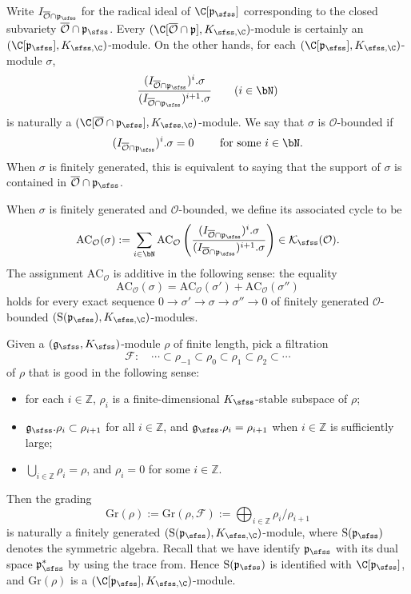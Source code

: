 \documentclass[12pt,a4paper]{amsart}
\newcommand{\CF}{{\mathcal {F}}}
\newcommand{\CK}{{\mathcal {K}}}
\newcommand{\CO}{{\mathcal {O}}}
\newcommand{\oS}{\operatorname{S}}
\newcommand{\g}{\mathfrak g}
\newcommand{\p}{\mathfrak p}
\newcommand{\Z}{\mathbb{Z}}
\newcommand{\be}{\begin {equation}}
\newcommand{\ee}{\end {equation}}
\numberwithin{equation}{section}
\theoremstyle{remark}
\begin{document}
Write $I_{\overline \CO\cap \p_\sfss}$ for the radical ideal of $\C[\p_\sfss]$ corresponding to the closed subvariety $\overline \CO\cap \p_\sfss$. 
Every $(\C[\overline \CO\cap \p], K_{\sfss, \C})$-module is certainly an $(\C[\p_\sfss], K_{\sfss,\C})$-module. 
On the other hands, for each  $(\C[\p_{\sfss}], K_{\sfss, \C})$-module $\sigma$, 
\[
  \frac{(I_{\overline \CO\cap \p_\sfss})^i.\sigma}{(I_{\overline \CO\cap \p_\sfss})^{i+1}.\sigma}\qquad (i\in \bN)
\]
is naturally a $(\C[\overline \CO\cap \p_\sfss], K_{\sfss, \C})$-module.
We say that $\sigma$ is $\CO$-bounded if 
\[
(I_{\overline \CO\cap \p_\sfss})^i .\sigma=0\qquad
\textrm{
for some $i\in \bN$.}
\]
When $\sigma$ is finitely generated, this is equivalent to saying that  the support of $\sigma$ is contained in $\overline{\CO}\cap \p_\sfss$.

 When $\sigma$ is finitely generated and $\CO$-bounded, we define its associated cycle to be
\[
  \mathrm{AC}_\CO(\sigma):=\sum_{i\in \bN}\mathrm{AC}_\CO\left(\frac{(I_{\overline \CO\cap \p_\sfss})^i.\sigma}{(I_{\overline \CO\cap \p_\sfss})^{i+1}.\sigma}\right)\in  \CK_\sfss(\CO).
\]
The assignment $\mathrm{AC}_\CO$ is additive in the following sense: the equality 
\[
 \mathrm{AC}_\CO(\sigma)= \mathrm{AC}_\CO(\sigma')+ \mathrm{AC}_\CO(\sigma'')
\]
holds for every exact sequence 
$0\rightarrow \sigma'\rightarrow \sigma\rightarrow \sigma''\rightarrow 0$ of finitely generated $\CO$-bounded $(\oS(\p_{\sfss}), K_{\sfss, \C})$-modules. 


Given a $(\g_\sfss, K_{\sfss})$-module $\rho$ of finite length, pick a filtration 
\be\label{goodf}
\CF:\quad  \cdots\subset \rho_{-1}\subset \rho_0\subset \rho_1\subset \rho_2\subset \cdots
\ee
of $\rho$ that is good in the following sense:
\begin{itemize}
\item for each $i\in \Z$, $\rho_i$ is a finite-dimensional  $K_{\sfss}$-stable subspace of $\rho$;
\item $\g_\sfss.\rho_i\subset \rho_{i+1}$ for all $i\in \Z$, and $\g_\sfss.\rho_i=\rho_{i+1}$ when  $i\in \Z$ is sufficiently large; 
\item $\bigcup_{i\in \Z} \rho_i=\rho$, and $\rho_i=0$ for some $i\in \Z$.
\end{itemize}
Then the grading 
\[
  \mathrm{Gr}(\rho):= \mathrm{Gr}(\rho,\CF):=\bigoplus_{i\in \Z} \rho_i/\rho_{i+1}
\]
is naturally a finitely generated  $(\oS(\p_{\sfss}), K_{\sfss, \C})$-module, where $\oS(\p_{\sfss})$ denotes the symmetric algebra. Recall that we have identify $\p_\sfss$ with its dual space $\p_\sfss^*$ by using the trace from. Hence $\oS(\p_{\sfss})$ is identified with $\C[\p_\sfss]$, and $\mathrm{Gr}(\rho)$ is a $(\C[\p_{\sfss}], K_{\sfss, \C})$-module. 
\end{document}
